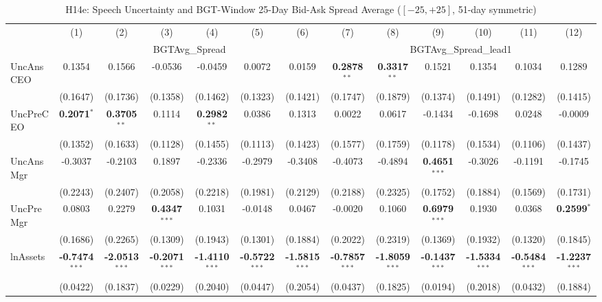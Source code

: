\documentclass[11pt,a4paper]{article}
\begin{document}
\clearpage
\begin{table}[htbp]
\centering
\caption{H14e: Speech Uncertainty and BGT-Window 25-Day Bid-Ask Spread Average ($[-25,+25]$, 51-day symmetric)}
\label{tab:h14e}
\scriptsize
\begin{tabular}{lcccccccccccc}
\toprule
 & (1) & (2) & (3) & (4) & (5) & (6) & (7) & (8) & (9) & (10) & (11) & (12) \\
 & \multicolumn{6}{c}{BGTAvg\_Spread} & \multicolumn{6}{c}{BGTAvg\_Spread\_lead1} \\
\cmidrule(lr){2-7} \cmidrule(lr){8-13}
\midrule
UncAnsCEO & 0.1354 & 0.1566 & -0.0536 & -0.0459 & 0.0072 & 0.0159 & \textbf{0.2878}$^{**}$ & \textbf{0.3317}$^{**}$ & 0.1521 & 0.1354 & 0.1034 & 0.1289 \\
 & (0.1647) & (0.1736) & (0.1358) & (0.1462) & (0.1323) & (0.1421) & (0.1747) & (0.1879) & (0.1374) & (0.1491) & (0.1282) & (0.1415) \\
UncPreCEO & \textbf{0.2071}$^{*}$ & \textbf{0.3705}$^{**}$ & 0.1114 & \textbf{0.2982}$^{**}$ & 0.0386 & 0.1313 & 0.0022 & 0.0617 & -0.1434 & -0.1698 & 0.0248 & -0.0009 \\
 & (0.1352) & (0.1633) & (0.1128) & (0.1455) & (0.1113) & (0.1423) & (0.1577) & (0.1759) & (0.1178) & (0.1534) & (0.1106) & (0.1437) \\
UncAnsMgr & -0.3037 & -0.2103 & 0.1897 & -0.2336 & -0.2979 & -0.3408 & -0.4073 & -0.4894 & \textbf{0.4651}$^{***}$ & -0.3026 & -0.1191 & -0.1745 \\
 & (0.2243) & (0.2407) & (0.2058) & (0.2218) & (0.1981) & (0.2129) & (0.2188) & (0.2325) & (0.1752) & (0.1884) & (0.1569) & (0.1731) \\
UncPreMgr & 0.0803 & 0.2279 & \textbf{0.4347}$^{***}$ & 0.1031 & -0.0148 & 0.0467 & -0.0020 & 0.1060 & \textbf{0.6979}$^{***}$ & 0.1930 & 0.0368 & \textbf{0.2599}$^{*}$ \\
 & (0.1686) & (0.2265) & (0.1309) & (0.1943) & (0.1301) & (0.1884) & (0.2022) & (0.2319) & (0.1369) & (0.1932) & (0.1320) & (0.1845) \\
\midrule
lnAssets & \textbf{-0.7474}$^{***}$ & \textbf{-2.0513}$^{***}$ & \textbf{-0.2071}$^{***}$ & \textbf{-1.4110}$^{***}$ & \textbf{-0.5722}$^{***}$ & \textbf{-1.5815}$^{***}$ & \textbf{-0.7857}$^{***}$ & \textbf{-1.8059}$^{***}$ & \textbf{-0.1437}$^{***}$ & \textbf{-1.5334}$^{***}$ & \textbf{-0.5484}$^{***}$ & \textbf{-1.2237}$^{***}$ \\
 & (0.0422) & (0.1837) & (0.0229) & (0.2040) & (0.0447) & (0.2054) & (0.0437) & (0.1825) & (0.0194) & (0.2018) & (0.0432) & (0.1884) \\

\end{tabular}
\end{table}
\end{document}
